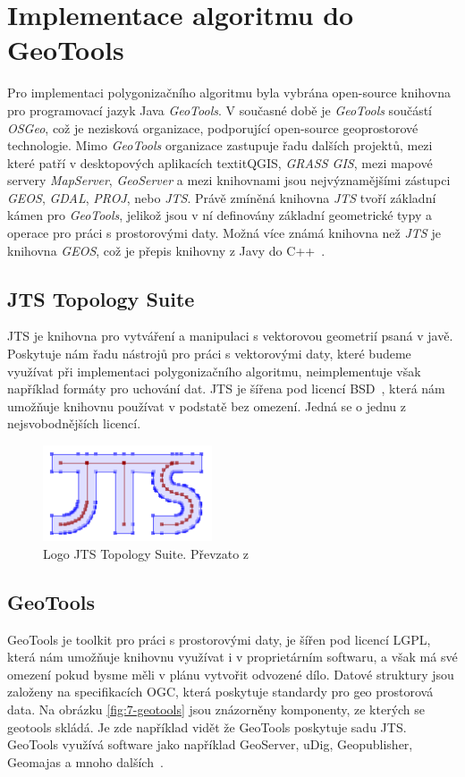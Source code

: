 \chapter{Implementace algoritmu do GeoTools}
\label{chap:implementacealgoritmudogeotools}
	Pro implementaci polygonizačního algoritmu byla vybrána open-source knihovna pro programovací jazyk Java \textit{GeoTools}. V současné době je \textit{GeoTools} součástí \textit{OSGeo}, což je nezisková organizace, podporující open-source geoprostorové technologie. Mimo \textit{GeoTools} organizace zastupuje řadu dalších projektů, mezi které patří v desktopových aplikacích textit{QGIS}, \textit{GRASS GIS}, mezi mapové servery \textit{MapServer}, \textit{GeoServer} a mezi knihovnami jsou nejvýznamějšími zástupci \textit{GEOS}, \textit{GDAL}, \textit{PROJ}, nebo \textit{JTS}. Právě zmíněná knihovna \textit{JTS} tvoří základní kámen pro \textit{GeoTools}, jelikož jsou v ní definovány základní geometrické typy a operace pro práci s prostorovými daty. Možná více známá knihovna než \textit{JTS} je knihovna \textit{GEOS}, což je přepis knihovny z Javy do C++~\cite{OSGeo,GeoTools}.

\section{JTS Topology Suite}
	JTS je knihovna pro vytváření a manipulaci s vektorovou geometrií psaná v javě. Poskytuje nám řadu nástrojů pro práci s vektorovými daty, které budeme využívat při implementaci polygonizačního algoritmu, neimplementuje však například formáty pro uchování dat. JTS je šířena pod licencí BSD~\cite{locationtech}, která nám umožňuje knihovnu používat v podstatě bez omezení. Jedná se o jednu z nejsvobodnějších licencí.
	
\begin{figure}[h]
  \centering
  \includegraphics[width=5cm]{./pictures/7/jts_logo.png}
  \caption{Logo JTS Topology Suite. Převzato z \cite{locationtech}}
  \label{fig:7-jts}
\end{figure}
	
\section{GeoTools}
	GeoTools je toolkit pro práci s prostorovými daty, je šířen pod licencí LGPL, která nám umožňuje knihovnu využívat i v proprietárním softwaru, a však má své omezení pokud bysme měli v plánu vytvořit odvozené dílo. Datové struktury jsou založeny na specifikacích OGC, která poskytuje standardy pro geo prostorová data. Na obrázku \ref{fig:7-geotools} jsou znázorněny komponenty, ze kterých se geotools skládá. Je zde například vidět že GeoTools poskytuje sadu JTS. GeoTools využívá software jako například GeoServer, uDig, Geopublisher, Geomajas a mnoho dalších~\citep{GeoTools}.

